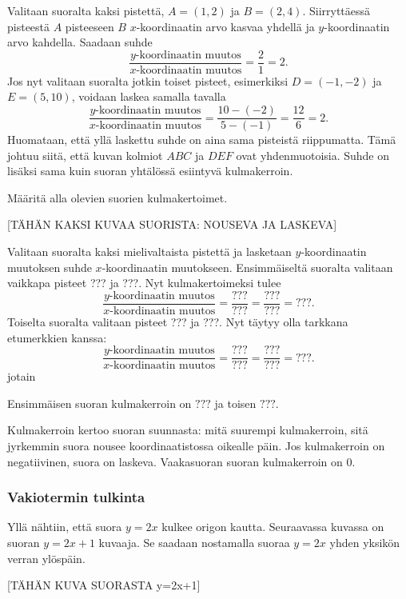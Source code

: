 Valitaan suoralta kaksi pistettä,
$A=(1, 2)$ ja $B=(2, 4)$. Siirryttäessä pisteestä $A$ pisteeseen $B$ $x$-koordinaatin arvo kasvaa yhdellä ja $y$-koordinaatin arvo kahdella. Saadaan suhde
\[
\frac{\text{$y$-koordinaatin muutos}}{\text{$x$-koordinaatin muutos}}=\frac{2}{1}=2.
\]
Jos nyt valitaan suoralta jotkin toiset pisteet, esimerkiksi $D=(-1, -2)$ ja $E=(5, 10)$, voidaan laskea samalla tavalla
\[
\frac{\text{$y$-koordinaatin muutos}}{\text{$x$-koordinaatin muutos}}=\frac{10-(-2)}{5-(-1)}=\frac{12}{6}=2.
\]
Huomataan, että yllä laskettu suhde on aina sama pisteistä riippumatta. Tämä johtuu siitä, että kuvan kolmiot $ABC$ ja $DEF$ ovat yhdenmuotoisia.
Suhde on lisäksi sama kuin suoran yhtälössä esiintyvä kulmakerroin.

\begin{esimerkki} Määritä alla olevien suorien kulmakertoimet.

[TÄHÄN KAKSI KUVAA SUORISTA: NOUSEVA JA LASKEVA]
\begin{esimratk} Valitaan suoralta kaksi mielivaltaista pistettä ja lasketaan $y$-koordinaatin muutoksen suhde $x$-koordinaatin muutokseen.
Ensimmäiseltä suoralta valitaan vaikkapa pisteet ??? ja ???. Nyt kulmakertoimeksi tulee
\[
\frac{\text{$y$-koordinaatin muutos}}{\text{$x$-koordinaatin muutos}}=\frac{???}{???}=\frac{???}{???}=???.
\]
Toiselta suoralta valitaan pisteet ??? ja ???. Nyt täytyy olla tarkkana etumerkkien kanssa:
\[
\frac{\text{$y$-koordinaatin muutos}}{\text{$x$-koordinaatin muutos}}=\frac{???}{???}=\frac{???}{???}=???.
\]
jotain
\end{esimratk}
\begin{esimvast}
Ensimmäisen suoran kulmakerroin on $???$ ja toisen $???$.
\end{esimvast}
\end{esimerkki}

Kulmakerroin kertoo suoran suunnasta: mitä suurempi kulmakerroin, sitä jyrkemmin suora nousee koordinaatistossa oikealle päin.
Jos kulmakerroin on negatiivinen, suora on laskeva. Vaakasuoran suoran kulmakerroin on 0.

\subsubsection*{Vakiotermin tulkinta}

Yllä nähtiin, että suora $y=2x$ kulkee origon kautta. Seuraavassa kuvassa on suoran $y=2x+1$ kuvaaja. Se saadaan nostamalla suoraa $y=2x$ yhden yksikön verran ylöspäin.

[TÄHÄN KUVA SUORASTA y=2x+1]

